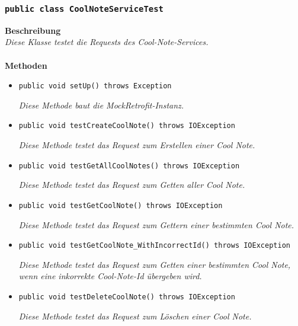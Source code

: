 \documentclass[a4paper]{scrreprt}
\begin{document}
	\subsubsection{\texttt{public class CoolNoteServiceTest}}
	\textbf{Beschreibung}\\
	\textit{Diese Klasse testet die Requests des Cool-Note-Services.}\\
	\\
	\textbf{Methoden}
	\begin{itemize}
		
		\item\texttt{{public void setUp() throws Exception}}
		
		\textit{Diese Methode baut die MockRetrofit-Instanz.}
		
		\item\texttt{{public void testCreateCoolNote() throws IOException}}
		
		\textit{Diese Methode testet das Request zum Erstellen einer Cool Note.}
		
		\item\texttt{{public void testGetAllCoolNotes() throws IOException}}
		
		\textit{Diese Methode testet das Request zum Getten aller Cool Note.}
		
		\item\texttt{{public void testGetCoolNote() throws IOException}}
		
		\textit{Diese Methode testet das Request zum Gettern einer bestimmten Cool Note.}
		
		\item\texttt{{public void testGetCoolNote\_WithIncorrectId() throws IOException}}
		
		\textit{Diese Methode testet das Request zum Getten einer bestimmten Cool Note, wenn eine inkorrekte Cool-Note-Id übergeben wird.}
		
		\item\texttt{{public void testDeleteCoolNote() throws IOException}}
		
		\textit{Diese Methode testet das Request zum Löschen einer Cool Note.}	
		
	\end{itemize}
\end{document}
